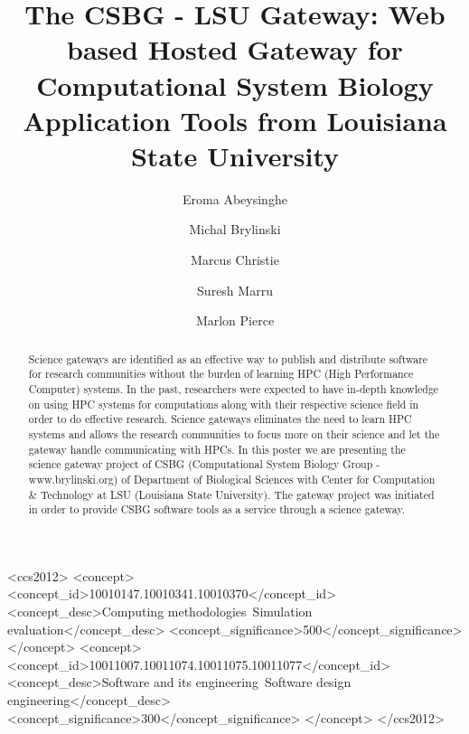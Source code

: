 \documentclass[sigconf]{acmart}
\begin{document}
\title{The CSBG - LSU Gateway: Web based Hosted Gateway for Computational System Biology Application Tools from Louisiana State University}

\author{Eroma Abeysinghe}

\author{Michal Brylinski}

\author{Marcus Christie}

\author{Suresh Marru}

\author{Marlon Pierce}

\begin{abstract}
Science gateways are identified as an effective way to publish and distribute software for research communities without the burden of learning HPC (High Performance Computer) systems. In the past, researchers were expected to have in-depth knowledge on using HPC systems for computations along with  their respective science field in order to do effective research. Science gateways eliminates the need to learn HPC systems and allows the research communities to focus more on their science and let the gateway handle communicating with HPCs. In this poster we are presenting the science gateway project of CSBG (Computational System Biology Group - www.brylinski.org) of  Department of Biological Sciences with Center for Computation \& Technology at LSU (Louisiana State University). The gateway project was initiated in order to provide CSBG software tools as a service through a science gateway.
\end{abstract}

%
%
\begin{CCSXML}
<ccs2012>
<concept>
<concept_id>10010147.10010341.10010370</concept_id>
<concept_desc>Computing methodologies~Simulation evaluation</concept_desc>
<concept_significance>500</concept_significance>
</concept>
<concept>
<concept_id>10011007.10011074.10011075.10011077</concept_id>
<concept_desc>Software and its engineering~Software design engineering</concept_desc>
<concept_significance>300</concept_significance>
</concept>
</ccs2012>
\end{CCSXML}
\end{document}
